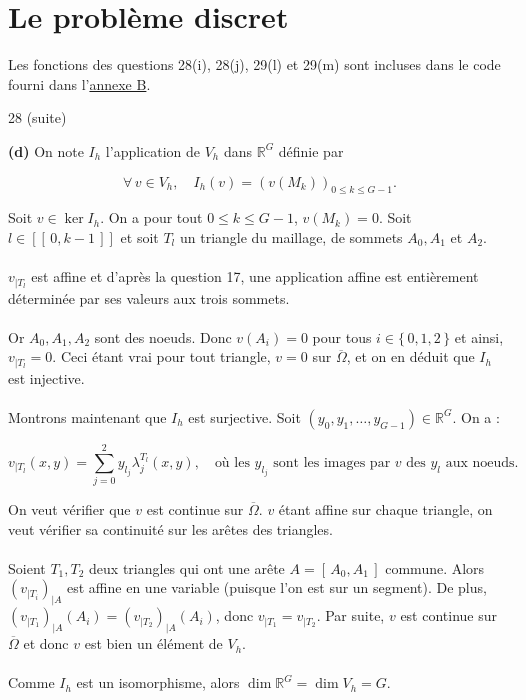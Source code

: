 \section{Le problème discret}

\begin{remark*}

    Les fonctions des questions 28(i), 28(j), 29(l) et 29(m) sont incluses dans le code fourni dans l'\hyperref[sec:fonctions]{annexe B}.

\end{remark*}

\begin{reponse}{28 (suite)}

    \textbf{(d)} On note $I_h$ l'application de $V_h$ dans $\mathbb{R}^G$ définie par

    \[
        \forall \, v \in V_h, \quad I_h(v)=(v(M_k))_{0 \leq k \leq G-1}.
    \]

    Soit $v \in \ker I_h$. On a pour tout $0 \leq k \leq G-1$, $v(M_k)=0$. Soit $l \in [\![ \, 0, k-1 \, ]\!]$ et soit $T_l$ un triangle du maillage, de sommets $A_0, A_1$ et $A_2$. \\ \\
    $v_{\vert T_l}$ est affine et d'après la question 17, une application affine est entièrement déterminée par ses valeurs aux trois sommets. \\ \\
    Or $A_0, A_1, A_2$ sont des noeuds. Donc $v(A_i)=0$ pour tous $i \in \{ \, 0,1,2 \, \}$ et ainsi, $v_{\vert T_l}=0$. Ceci étant vrai pour tout triangle, $v=0$ sur $\overline{\Omega}$, et on en déduit que $I_h$ est injective. \\ \\
    Montrons maintenant que $I_h$ est surjective. Soit $(y_0, y_1, \dots, y_{G-1}) \in \mathbb{R}^G$. On a :

    \[
        v_{\vert T_l}(x,y) = \sum_{j=0}^2 y_{l_j}\lambda_j^{T_l}(x,y), \quad \text{où les $y_{l_j}$ sont les images par $v$ des $y_l$ aux noeuds.}
    \]

    On veut vérifier que $v$ est continue sur $\overline{\Omega}$. $v$ étant affine sur chaque triangle, on veut vérifier sa continuité sur les arêtes des triangles. \\ \\
    Soient $T_1, T_2$ deux triangles qui ont une arête $A = [ \, A_0, A_1 \,]$ commune. Alors $\left(v_{\vert T_i}\right)_{\vert A}$ est affine en une variable (puisque l'on est sur un segment). De plus, $\left(v_{\vert T_1}\right)_{\vert A}(A_i) = \left(v_{\vert T_2}\right)_{\vert A}(A_i)$, donc $v_{\vert T_1} = v_{\vert T_2}$. Par suite, $v$ est continue sur $\overline{\Omega}$ et donc $v$ est bien un élément de $V_h$. \\ \\
    Comme $I_h$ est un isomorphisme, alors $\dim \mathbb{R}^G = \dim V_h = G$.


\end{reponse}
